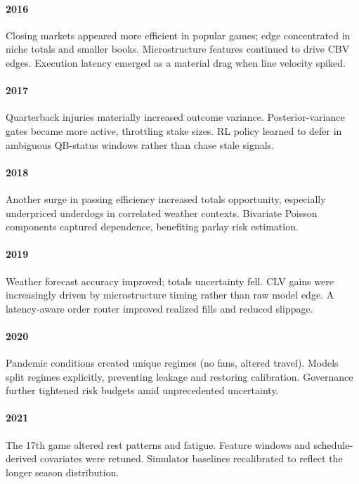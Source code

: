 \documentclass[12pt]{report}  %
\numberwithin{equation}{section}
\theoremstyle{plain}
\theoremstyle{definition}
\theoremstyle{remark}
\begin{document}
\paragraph{2016} Closing markets appeared more efficient in popular games; edge concentrated in niche totals and smaller books. Microstructure features continued to drive CBV edges. Execution latency emerged as a material drag when line velocity spiked.

\paragraph{2017} Quarterback injuries materially increased outcome variance. Posterior-variance gates became more active, throttling stake sizes. RL policy learned to defer in ambiguous QB-status windows rather than chase stale signals.

\paragraph{2018} Another surge in passing efficiency increased totals opportunity, especially underpriced underdogs in correlated weather contexts. Bivariate Poisson components captured dependence, benefiting parlay risk estimation.

\paragraph{2019} Weather forecast accuracy improved; totals uncertainty fell. CLV gains were increasingly driven by microstructure timing rather than raw model edge. A latency-aware order router improved realized fills and reduced slippage.

\paragraph{2020} Pandemic conditions created unique regimes (no fans, altered travel). Models split regimes explicitly, preventing leakage and restoring calibration. Governance further tightened risk budgets amid unprecedented uncertainty.

\paragraph{2021} The 17th game altered rest patterns and fatigue. Feature windows and schedule-derived covariates were retuned. Simulator baselines recalibrated to reflect the longer season distribution.
\end{document}
